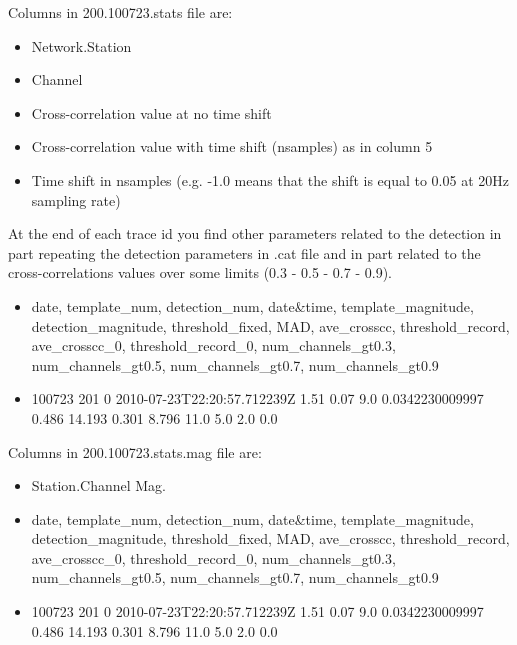 \documentclass[a4paper,10pt,english]{sphinxmanual}
\begin{document}
Columns in 200.100723.stats file are:
\begin{itemize}
\item {} 
Network.Station

\item {} 
Channel

\item {} 
Cross-correlation value at no time shift

\item {} 
Cross-correlation value with time shift (nsamples) as in column 5

\item {} 
Time shift in nsamples (e.g. -1.0 means that the shift is equal to 0.05 at 20Hz sampling rate)

\end{itemize}

At the end of each trace id you find other parameters related to the detection in part repeating the detection parameters
in .cat file and in part related to the cross-correlations values over some limits (0.3 - 0.5 - 0.7 - 0.9).
\begin{itemize}
\item {} 
date, template\_num, detection\_num, date\&time, template\_magnitude, detection\_magnitude, threshold\_fixed, MAD, ave\_crosscc, threshold\_record, ave\_crosscc\_0, threshold\_record\_0, num\_channels\_gt0.3, num\_channels\_gt0.5, num\_channels\_gt0.7, num\_channels\_gt0.9

\item {} 
100723 201 0 2010-07-23T22:20:57.712239Z 1.51 0.07 9.0 0.0342230009997 0.486 14.193 0.301 8.796 11.0 5.0 2.0 0.0

\end{itemize}

\begin{sphinxVerbatim}[commandchars=\\\{\}]

\end{sphinxVerbatim}

Columns in 200.100723.stats.mag file are:
\begin{itemize}
\item {} 
Station.Channel Mag.

\item {} 
date, template\_num, detection\_num, date\&time, template\_magnitude, detection\_magnitude, threshold\_fixed, MAD, ave\_crosscc, threshold\_record, ave\_crosscc\_0, threshold\_record\_0, num\_channels\_gt0.3, num\_channels\_gt0.5, num\_channels\_gt0.7, num\_channels\_gt0.9

\item {} 
100723 201 0 2010-07-23T22:20:57.712239Z 1.51 0.07 9.0 0.0342230009997 0.486 14.193 0.301 8.796 11.0 5.0 2.0 0.0

\end{itemize}
\end{document}
